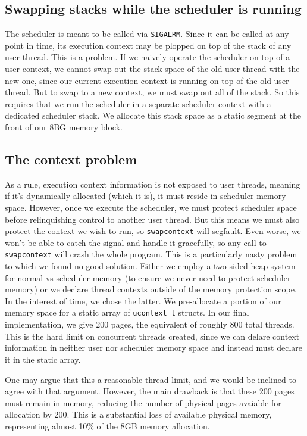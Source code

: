 \documentclass{article}
\begin{document}
\subsection{Swapping stacks while the scheduler is running}
The scheduler is meant to be called via \verb|SIGALRM|. Since it can be called at any point in time, its execution context may be plopped on top of the stack of any user thread. This is a problem. If we naively operate the scheduler on top of a user context, we cannot swap out the stack space of the old user thread with the new one, since our current execution context is running on top of the old user thread. But to swap to a new context, we must swap out all of the stack. So this requires that we run the scheduler in a separate scheduler context with a dedicated scheduler stack. We allocate this stack space as a static segment at the front of our 8BG memory block.

\subsection{The context problem}
As a rule, execution context information is not exposed to user threads, meaning if it's dynamically allocated (which it is), it must reside in scheduler memory space. However, once we execute the scheduler, we must protect scheduler space before relinquishing control to another user thread. But this means we must also protect the context we wish to run, so \verb|swapcontext| will segfault. Even worse, we won't be able to catch the signal and handle it gracefully, so any call to \verb|swapcontext| will crash the whole program. This is a particularly nasty problem to which we found no good solution. Either we employ a two-sided heap system for normal vs scheduler memory (to ensure we never need to protect scheduler memory) or we declare thread contexts outside of the memory protection scope. In the interest of time, we chose the latter. We pre-allocate a portion of our memory space for a static array of \verb|ucontext_t| structs. In our final implementation, we give 200 pages, the equivalent of roughly 800 total threads. This is the hard limit on concurrent threads created, since we can delare context information in neither user nor scheduler memory space and instead must declare it in the static array.

One may argue that this a reasonable thread limit, and we would be inclined to agree with that argument. However, the main drawback is that these 200 pages must remain in  memory, reducing the number of physical pages avaiable for allocation by 200. This is a substantial loss of available physical memory, representing almost 10\% of the 8GB memory allocation.
\end{document}
